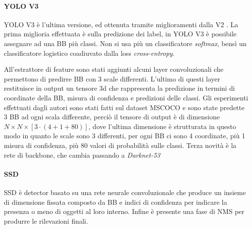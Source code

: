 \paragraph{YOLO V3} 
\ac{YOLO} V3 è l'ultima versione, ed ottenuta  tramite miglioramenti dalla V2 \cite{redmon2018yolov3}. La prima miglioria effettuata è sulla predizione dei label, in \ac{YOLO} V3 è possibile assegnare ad una \ac{BB} più classi. Non si usa più un classificatore \textit{softmax}, bensì un classificatore logistico coadiuvato dalla loss \textit{cross-entropy}.

All'estrattore di feature sono stati aggiunti alcuni layer convoluzionali che permettono di predirre \ac{BB} con 3 scale differenti. L'ultimo di questi layer restituisce in output un tensore 3d che rappresenta la predizione in termini di coordinate della \ac{BB}, misura di confidenza e predizioni delle classi. Gli esperimenti effettuati dagli autori sono stati fatti sul dataset \ac{MSCOCO} e sono state predette 3 \ac{BB} ad ogni scala differente, perciò il tensore di output è di dimensione $N \times N \times [3 \cdot (4 + 1 + 80)]$, dove l'ultima dimensione è strutturata in questo modo in quanto le scale sono 3 differenti, per ogni \ac{BB} ci sono 4 coordinate, più 1 misura di confidenza, più $80$ valori di probabilità sulle classi. 
Terza novità è la rete di backbone, che cambia passando a \textit{Darknet-53}
\paragraph{SSD} 
\ac{SSD} \cite{liu2016ssd} è detector basato su una rete neurale convoluzionale che produce un insieme di dimensione fissata composto da \ac{BB} e indici di confidenza per indicare la presenza o meno di oggetti al loro interno. Infine è presente una fase di \ac{NMS} per produrre le rilevazioni finali. 

